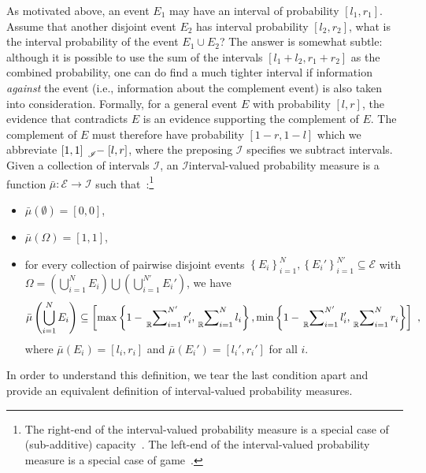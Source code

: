 \documentclass{article}
\theoremstyle{remark}
\newcommand{\events}{\ensuremath{\mathcal{E}}}
\begin{document}
As motivated above, an event $E_{1}$ may have an interval of probability
$[l_{1},r_{1}]$. Assume that another disjoint event $E_{2}$ has
interval probability $[l_{2},r_{2}]$, what is the interval probability
of the event $E_{1}\cup E_{2}$? The answer is somewhat subtle: although
it is possible to use the sum of the intervals $[l_{1}+l_{2},r_{1}+r_{2}]$
as the combined probability, one can do find a much tighter interval
if information \emph{against} the event (i.e., information about the
complement event) is also taken into consideration. Formally, for
a general event $E$ with probability $[l,r]$, the evidence that
contradicts $E$ is an evidence supporting the complement of $E$.
The complement of $E$ must therefore have probability $\left[1-r,1-l\right]$
which we abbreviate $\left[1,1\right]\tensor*[_{\mathscr{I}}]{-}{}\left[l,r\right]$,
where the preposing $\mathscr{I}$ specifies we subtract intervals.
Given a collection of intervals $\mathscr{I}$, an $\mathscr{I}$\textendash interval-valued
probability measure is a function $\bar{\mu}:\events\rightarrow\mathscr{I}$
such that~\cite{JamisonLodwick2004}:\footnote{The right-end of the interval-valued probability measure is a special
case of (sub-additive) capacity~\cite{Choquet1954,Graf1980,Goodman2013}.
The left-end of the interval-valued probability measure is a special
case of game~\cite{Shapley1965}.} 
\begin{itemize}
\item $\bar{\mu}(\emptyset)=[0,0]$, 
\item $\bar{\mu}(\Omega)=[1,1]$, 
\item for every collection of pairwise disjoint events $\left\{ E_{i}\right\} _{i=1}^{N},\left\{ E_{i}'\right\} _{i=1}^{N'}\subseteq\events$
with $\Omega=\left(\bigcup_{i=1}^{N}E_{i}\right)\bigcup\left(\bigcup_{i=1}^{N'}E_{i}'\right)$,
we have 
\[
\bar{\mu}\left(\bigcup_{i=1}^{N}E_{i}\right)\subseteq\left[\max\left\{ 1-\sideset{_{\mathbb{R}}}{_{i=1}^{N'}}\sum r_{i}',\sideset{_{\mathbb{R}}}{_{i=1}^{N}}\sum l_{i}\right\} ,\min\left\{ 1-\sideset{_{\mathbb{R}}}{_{i=1}^{N'}}\sum l_{i}',\sideset{_{\mathbb{R}}}{_{i=1}^{N}}\sum r_{i}\right\} \right]\textrm{ ,}
\]
where $\bar{\mu}\left(E_{i}\right)=[l_{i},r_{i}]$ and $\bar{\mu}\left(E_{i}'\right)=[l_{i}',r_{i}']$
for all $i$.
\end{itemize}
In order to understand this definition, we tear the last condition
apart and provide an equivalent definition of interval-valued probability
measures.
\end{document}
